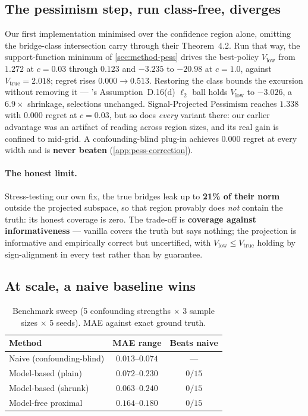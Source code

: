 \documentclass{article}
\theoremstyle{plain}
\theoremstyle{definition}
\begin{document}
\subsection{The pessimism step, run class-free, diverges}
\label{sec:exp-pess}
Our first implementation minimised over the confidence region alone, omitting the
bridge-class intersection \citet{hong2024} carry through their Theorem~4.2. Run
that way, the support-function minimum of \cref{sec:method-pess} drives the
best-policy $V_{\mathrm{low}}$ from $1.272$ at $c{=}0.03$ through $0.123$ and
$-3.235$ to $\mathbf{-20.98}$ at $c{=}1.0$, against $V_{\mathrm{true}}=2.018$;
regret rises $0.000\to0.513$. Restoring the class bounds the excursion without
removing it --- \citeauthor{hong2024}'s Assumption~D.16(d) $\ell_2$ ball holds
$V_{\mathrm{low}}$ to $-3.026$, a $6.9\times$ shrinkage, selections unchanged.
Signal-Projected Pessimism reaches $1.338$ with $0.000$ regret at $c{=}0.03$, but
so does \emph{every} variant there: our earlier advantage was an artifact of
reading across region sizes, and its real gain is confined to mid-grid. A
confounding-blind plug-in achieves $0.000$ regret at every width and is
\textbf{never beaten} (\cref{app:pess-correction}).

\paragraph{The honest limit.} Stress-testing our own fix, the true bridges leak
up to \textbf{21\% of their norm} outside the projected subspace, so that region
provably does \emph{not} contain the truth: its honest coverage is zero. The
trade-off is \textbf{coverage against informativeness} --- vanilla covers the
truth but says nothing; the projection is informative and empirically correct but
uncertified, with $V_{\mathrm{low}} \le V_{\mathrm{true}}$ holding by
sign-alignment in every test rather than by guarantee.

\subsection{At scale, a naive baseline wins}
\label{sec:exp-bench}
\begin{table}[t]
\caption{Benchmark sweep (5 confounding strengths $\times$ 3 sample sizes $\times$
5 seeds). MAE against exact ground truth.}
\label{tab:bench}
\vskip 0.1in
\begin{center}\small
\begin{tabular}{@{}lcc@{}}
\toprule
Method & MAE range & Beats naive \\
\midrule
Naive (confounding-blind) & $\mathbf{0.013}$--$\mathbf{0.074}$ & --- \\
Model-based (plain) & $0.072$--$0.230$ & $0/15$ \\
Model-based (shrunk) & $0.063$--$0.240$ & $0/15$ \\
Model-free proximal & $0.164$--$0.180$ & $0/15$ \\
\bottomrule
\end{tabular}
\end{center}
\vskip -0.15in
\end{table}
\end{document}

